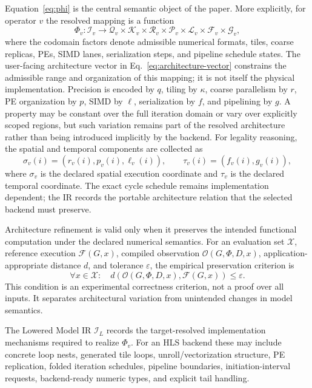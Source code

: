 \documentclass{article}
\begin{document}
Equation~\ref{eq:phi} is the central semantic object of the paper. More explicitly, for operator $v$ the resolved mapping is a function
\begin{equation}
\Phi_v:
\mathcal{I}_v
\rightarrow
\mathcal{Q}_v\times\mathcal{K}_v\times\mathcal{R}_v\times\mathcal{P}_v\times\mathcal{L}_v\times\mathcal{F}_v\times\mathcal{G}_v,
\label{eq:phi-type}
\end{equation}
where the codomain factors denote admissible numerical formats, tiles, coarse replicas, PEs, SIMD lanes, serialization steps, and pipeline schedule states. The user-facing architecture vector in Eq.~\ref{eq:architecture-vector} constrains the admissible range and organization of this mapping; it is not itself the physical implementation. Precision is encoded by $q$, tiling by $\kappa$, coarse parallelism by $r$, PE organization by $p$, SIMD by $\ell$, serialization by $f$, and pipelining by $g$. A property may be constant over the full iteration domain or vary over explicitly scoped regions, but such variation remains part of the resolved architecture rather than being introduced implicitly by the backend. For legality reasoning, the spatial and temporal components are collected as
\begin{equation}
\sigma_v(i)=(r_v(i),p_v(i),\ell_v(i)),
\qquad
\tau_v(i)=(f_v(i),g_v(i)),
\label{eq:space-time-coordinates}
\end{equation}
where $\sigma_v$ is the declared spatial execution coordinate and $\tau_v$ is the declared temporal coordinate. The exact cycle schedule remains implementation dependent; the IR records the portable architecture relation that the selected backend must preserve.

Architecture refinement is valid only when it preserves the intended functional computation under the declared numerical semantics. For an evaluation set $\mathcal{X}$, reference execution $\mathcal{F}(G,x)$, compiled observation $\mathcal{O}(G,\Phi,D,x)$, application-appropriate distance $d$, and tolerance $\varepsilon$, the empirical preservation criterion is
\begin{equation}
\forall x\in\mathcal{X}:\quad
d\!\left(\mathcal{O}(G,\Phi,D,x),\mathcal{F}(G,x)\right)\le\varepsilon.
\label{eq:empirical-preservation}
\end{equation}
This condition is an experimental correctness criterion, not a proof over all inputs. It separates architectural variation from unintended changes in model semantics.


The Lowered Model IR $\mathcal{I}_{L}$ records the target-resolved implementation mechanisms required to realize $\Phi_v$. For an HLS backend these may include concrete loop nests, generated tile loops, unroll/vectorization structure, PE replication, folded iteration schedules, pipeline boundaries, initiation-interval requests, backend-ready numeric types, and explicit tail handling.
\end{document}
